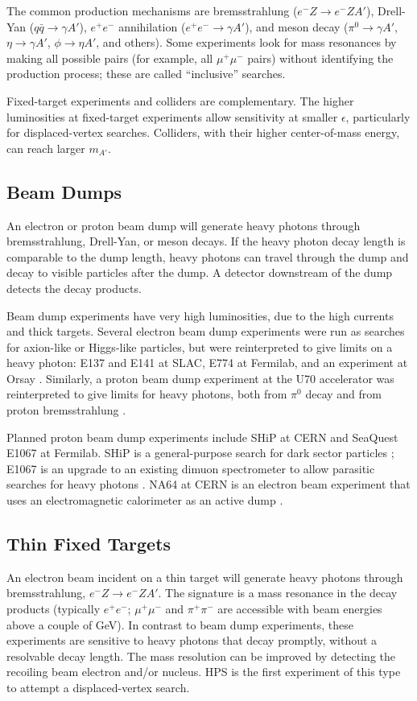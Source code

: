 The common production mechanisms are bremsstrahlung ($e^- Z \to e^- Z A'$), Drell-Yan ($q \bar{q} \to \gamma A'$), $e^+e^-$ annihilation ($e^+e^- \to \gamma A'$), and meson decay ($\pi^0 \to \gamma A'$, $\eta \to \gamma A'$, $\phi \to \eta A'$, and others).
Some experiments look for mass resonances by making all possible pairs (for example, all $\mu^+\mu^-$ pairs) without identifying the production process; these are called ``inclusive'' searches.

Fixed-target experiments and colliders are complementary.
The higher luminosities at fixed-target experiments allow sensitivity at smaller $\epsilon$, particularly for displaced-vertex searches.
Colliders, with their higher center-of-mass energy, can reach larger $m_{A'}$.

\subsection{Beam Dumps}
An electron or proton beam dump will generate heavy photons through bremsstrahlung, Drell-Yan, or meson decays.
If the heavy photon decay length is comparable to the dump length, heavy photons can travel through the dump and decay to visible particles after the dump.
A detector downstream of the dump detects the decay products.


Beam dump experiments have very high luminosities, due to the high currents and thick targets.
Several electron beam dump experiments were run as searches for axion-like or Higgs-like particles, but were reinterpreted to give limits on a heavy photon: E137 \cite{bjorken_search_1988} and E141 \cite{riordan_search_1987} at SLAC, E774 \cite{bross_search_1991} at Fermilab, and an experiment at Orsay \cite{davier_unambiguous_1989}.
Similarly, a proton beam dump experiment at the U70 accelerator was reinterpreted to give limits for heavy photons, both from $\pi^0$ decay and from proton bremsstrahlung \cite{blumlein_new_2014}.

Planned proton beam dump experiments include SHiP at CERN and SeaQuest E1067 at Fermilab.
SHiP is a general-purpose search for dark sector particles \cite{ship_collaboration_facility_2015}; E1067 is an upgrade to an existing dimuon spectrometer to allow parasitic searches for heavy photons \cite{gardner_new_2016}.
NA64 at CERN is an electron beam experiment that uses an electromagnetic calorimeter as an active dump \cite{gninenko_search_2014}.

\subsection{Thin Fixed Targets}
An electron beam incident on a thin target will generate heavy photons through bremsstrahlung, $e^- Z \to e^- Z A'$.
The signature is a mass resonance in the decay products (typically $e^+e^-$; $\mu^+\mu^-$ and $\pi^+\pi^-$ are accessible with beam energies above a couple of GeV).
In contrast to beam dump experiments, these experiments are sensitive to heavy photons that decay promptly, without a resolvable decay length.
The mass resolution can be improved by detecting the recoiling beam electron and/or nucleus.
HPS is the first experiment of this type to attempt a displaced-vertex search.

